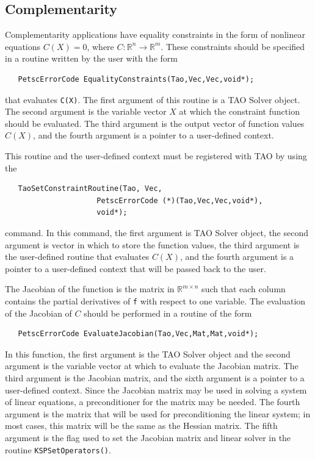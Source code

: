 \documentclass[]{book}
\newcommand{\R}{\mathbb R}
\renewcommand{\Re}{\R}
\begin{document}
\subsection{Complementarity}
Complementarity applications have equality constraints in the form of 
nonlinear equations 
$C(X) = 0$, where $C: \Re^n \to \Re^m$.
These constraints should be specified in a 
routine written by the user with the form
\begin{verbatim}
   PetscErrorCode EqualityConstraints(Tao,Vec,Vec,void*);
\end{verbatim}
that evaluates {\tt C(X)}.
\noindent
The first argument of this routine is a TAO Solver object.  The second argument
is the variable vector $X$ at which the constraint function should be 
evaluated.  
The third argument is the output vector of function values $C(X)$, and the fourth
argument is a pointer to a user-defined context.

This routine and the user-defined context 
must be registered with TAO by using the
\begin{verbatim}
   TaoSetConstraintRoutine(Tao, Vec,
                     PetscErrorCode (*)(Tao,Vec,Vec,void*),
                     void*);
\end{verbatim}
command. 
\noindent
In this command, the first argument is TAO Solver object,
the second argument is vector in which to store the function values,
the third argument is the user-defined routine that evaluates $C(X)$,
and the fourth argument is a pointer to a user-defined context that will
be passed back to the user.

The Jacobian of the function is the matrix in $\Re^{m \times n}$
such that each column contains the partial derivatives of {\tt f} with respect
to one variable. 
The evaluation of the Jacobian of $C$ should be performed in a routine
of the form
\begin{verbatim}
   PetscErrorCode EvaluateJacobian(Tao,Vec,Mat,Mat,void*);
\end{verbatim}
\noindent
In this function, the first argument is the TAO Solver object and the 
second argument is the variable vector at which to evaluate the 
Jacobian matrix. The third argument is the Jacobian matrix,
and the sixth argument is a pointer to a user-defined context.
Since the Jacobian matrix may be used in solving a system of linear equations,
a preconditioner for the matrix may be needed.  The fourth argument is the matrix that will be used
for preconditioning the linear system; in most cases, this
matrix will be the same as the Hessian matrix.  The fifth
argument is the flag used to set the Jacobian matrix and
linear solver in the routine {\tt KSPSetOperators()}.
\end{document}
